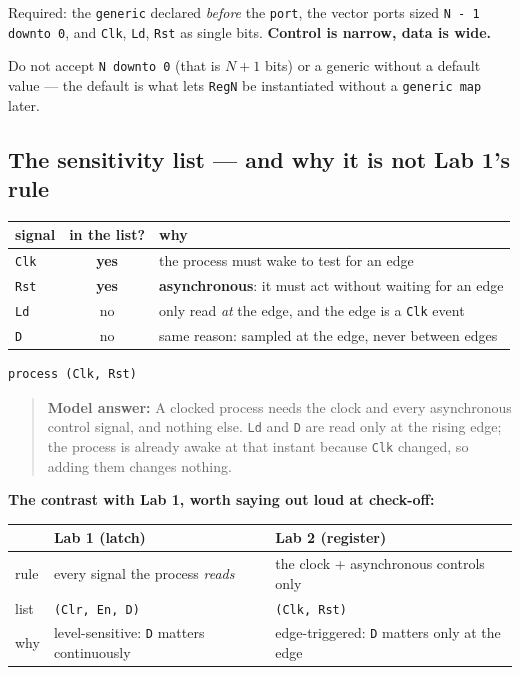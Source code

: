 \documentclass[11pt]{article}
\newcommand{\code}[1]{\texttt{#1}}
\begin{document}
Required: the \code{generic} declared \emph{before} the \code{port}, the vector
ports sized \code{N - 1 downto 0}, and \code{Clk}, \code{Ld}, \code{Rst} as single
bits. \textbf{Control is narrow, data is wide.}

Do not accept \code{N downto 0} (that is $N+1$ bits) or a generic without a
default value --- the default is what lets \code{RegN} be instantiated without a
\code{generic map} later.

\subsection*{The sensitivity list --- and why it is not Lab 1's rule}

\begin{center}
\begin{tabular}{lcl}
\toprule
signal & in the list? & why \\
\midrule
\code{Clk} & \textbf{yes} & the process must wake to test for an edge \\
\code{Rst} & \textbf{yes} & \textbf{asynchronous}: it must act without waiting for an edge \\
\code{Ld}  & no & only read \emph{at} the edge, and the edge is a \code{Clk} event \\
\code{D}   & no & same reason: sampled at the edge, never between edges \\
\bottomrule
\end{tabular}
\end{center}

\begin{lstlisting}
process (Clk, Rst)
\end{lstlisting}

\begin{quote}
\textbf{Model answer:} A clocked process needs the clock and every asynchronous
control signal, and nothing else. \code{Ld} and \code{D} are read only at the
rising edge; the process is already awake at that instant because \code{Clk}
changed, so adding them changes nothing.
\end{quote}

\textbf{The contrast with Lab 1, worth saying out loud at check-off:}

\begin{center}
\begin{tabular}{lll}
\toprule
& Lab 1 (latch) & Lab 2 (register) \\
\midrule
rule & every signal the process \emph{reads} & the clock + asynchronous controls only \\
list & \code{(Clr, En, D)} & \code{(Clk, Rst)} \\
why & level-sensitive: \code{D} matters continuously & edge-triggered: \code{D} matters only at the edge \\
\bottomrule
\end{tabular}
\end{center}
\end{document}
